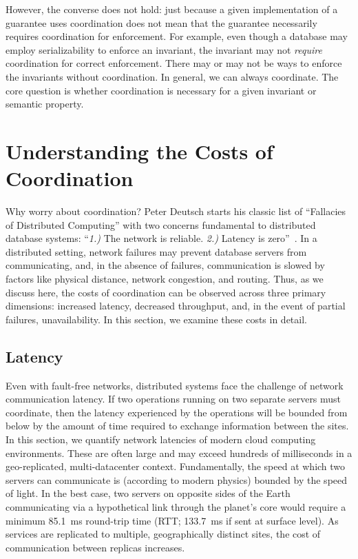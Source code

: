 However, the converse does not hold: just because a given
implementation of a guarantee uses coordination does not mean that the
guarantee necessarily requires coordination for enforcement. For
example, even though a database may employ serializability to enforce
an invariant, the invariant may not \textit{require} coordination for
correct enforcement. There may or may not be ways to enforce the
invariants without coordination. In general, we can always
coordinate. The core question is whether coordination is necessary for
a given invariant or semantic property.

\section{Understanding the Costs of Coordination}

Why worry about coordination? Peter Deutsch starts his classic list of
``Fallacies of Distributed Computing'' with two concerns fundamental
to distributed database systems: ``\textit{1.)}  The network is
reliable. \textit{2.)} Latency is zero''~\cite{fallacies-deutsch}. In
a distributed setting, network failures may prevent database servers
from communicating, and, in the absence of failures, communication is
slowed by factors like physical distance, network congestion, and
routing. Thus, as we discuss here, the costs of coordination can be
observed across three primary dimensions: increased latency, decreased
throughput, and, in the event of partial failures, unavailability. In
this section, we examine these costs in detail.


\subsection{Latency}
\label{sec:latency}

Even with fault-free networks, distributed systems face the challenge
of network communication latency. If two operations running on two
separate servers must coordinate, then the latency experienced by the
operations will be bounded from below by the amount of time required to
exchange information between the sites. In this section, we quantify
network latencies of modern cloud computing environments. These are
often large and may exceed hundreds of milliseconds in a
geo-replicated, multi-datacenter context.  Fundamentally, the speed at
which two servers can communicate is (according to modern physics)
bounded by the speed of light. In the best case, two servers on
opposite sides of the Earth communicating via a hypothetical link
through the planet's core would require a minimum 85.1~ms round-trip
time (RTT; 133.7~ms if sent at surface level). As services are
replicated to multiple, geographically distinct sites, the cost of
communication between replicas increases.

